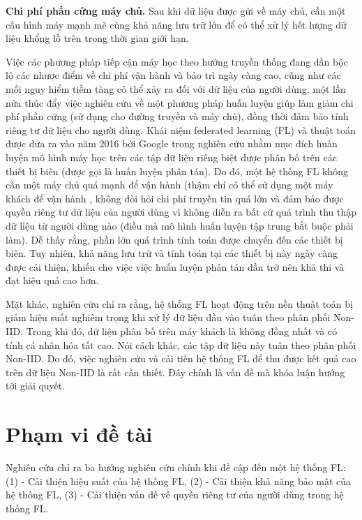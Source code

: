 \textbf{Chi phí phần cứng máy chủ.} Sau khi dữ liệu được gửi về máy chủ, cần một cấu hình máy mạnh mẽ cùng khả năng lưu trữ lớn để có thể xử lý hết lượng dữ liệu khổng lồ trên trong thời gian giới hạn.

Việc các phương pháp tiếp cận máy học theo hướng truyền thống đang dần bộc lộ các nhược điểm về chi phí vận hành và bảo trì ngày càng cao, cũng như các mối nguy hiểm tiềm tàng có thể xảy ra đối với dữ liệu của người dùng, một lần nữa thúc đẩy việc nghiên cứu về một phương pháp huấn luyện giúp làm giảm chi phí phần cứng (sử dụng cho đường truyền và máy chủ), đồng thời đảm bảo tính riêng tư dữ liệu cho người dùng. Khái niệm federated learning (FL) và thuật toán  được đưa ra vào năm 2016 bởi Google trong nghiên cứu \cite{mcmahan2017communication} nhằm mục đích huấn luyện mô hình máy học trên các tập dữ liệu riêng biệt được phân bố trên các thiết bị biên (được gọi là huấn luyện phân tán). Do đó, một hệ thống FL không cần một máy chủ quá mạnh để vận hành (thậm chí có thể sử dụng một máy khách để vận hành \cite{yin2021comprehensive} , không đòi hỏi chi phí truyền tin quá lớn và đảm bảo được quyền riêng tư dữ liệu của người dùng vì không diễn ra bất cứ quá trình thu thập dữ liệu từ người dùng nào (điều mà mô hình huấn luyện tập trung bắt buộc phải làm). Dễ thấy rằng, phần lớn quá trình tính toán được chuyển đến các thiết bị biên. Tuy nhiên, khả năng lưu trữ và tính toán tại các thiết bị này ngày càng được cải thiện, khiến cho việc việc huấn luyện phân tán dần trở nên khả thi và đạt hiệu quả cao hơn.

Mặt khác, nghiên cứu \cite{zhu2021federated} chỉ ra rằng, hệ thống FL hoạt động trên nền thuật toán  bị giảm hiệu suất nghiêm trọng khi xử lý dữ liệu đầu vào tuân theo phân phối Non-IID. Trong khi đó, dữ liệu phân bố trên máy khách là không đồng nhất và có tính cá nhân hóa tất cao. Nói cách khác, các tập dữ liệu này tuân theo phân phối Non-IID. Do đó, việc nghiên cứu và cải tiến hệ thống FL để thu được kết quả cao trên dữ liệu Non-IID là rất cần thiết. Đây chính là vấn đề mà khóa luận hướng tới giải quyết.

\section{Phạm vi đề tài}

Nghiên cứu \cite{yin2021comprehensive} chỉ ra ba hướng nghiên cứu chính khi đề cập đến một hệ thống FL: (1) - Cải thiện hiệu suất của hệ thống FL, (2) - Cải thiện khả năng bảo mật của hệ thống FL, (3) - Cải thiện vấn đề về quyền riêng tư của người dùng trong hệ thống FL.

